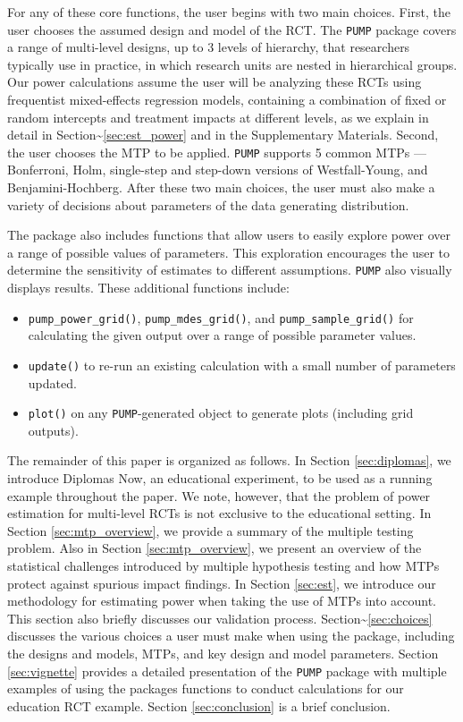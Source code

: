 \documentclass[
]{article}
\providecommand{\tightlist}{%
  \setlength{\itemsep}{0pt}\setlength{\parskip}{0pt}}
\begin{document}
For any of these core functions, the user begins with two main choices.
First, the user chooses the assumed design and model of the RCT. The
\texttt{PUMP} package covers a range of multi-level designs, up to 3
levels of hierarchy, that researchers typically use in practice, in
which research units are nested in hierarchical groups. Our power
calculations assume the user will be analyzing these RCTs using
frequentist mixed-effects regression models, containing a combination of
fixed or random intercepts and treatment impacts at different levels, as
we explain in detail in Section\textasciitilde{}\ref{sec:est_power} and
in the Supplementary Materials. Second, the user chooses the MTP to be
applied. \texttt{PUMP} supports 5 common MTPs --- Bonferroni, Holm,
single-step and step-down versions of Westfall-Young, and
Benjamini-Hochberg. After these two main choices, the user must also
make a variety of decisions about parameters of the data generating
distribution.

The package also includes functions that allow users to easily explore
power over a range of possible values of parameters. This exploration
encourages the user to determine the sensitivity of estimates to
different assumptions. \texttt{PUMP} also visually displays results.
These additional functions include:

\begin{itemize}
\tightlist
\item
  \texttt{pump\_power\_grid()}, \texttt{pump\_mdes\_grid()}, and
  \texttt{pump\_sample\_grid()} for calculating the given output over a
  range of possible parameter values.
\item
  \texttt{update()} to re-run an existing calculation with a small
  number of parameters updated.
\item
  \texttt{plot()} on any \texttt{PUMP}-generated object to generate
  plots (including grid outputs).
\end{itemize}

The remainder of this paper is organized as follows. In Section
\ref{sec:diplomas}, we introduce Diplomas Now, an educational
experiment, to be used as a running example throughout the paper. We
note, however, that the problem of power estimation for multi-level RCTs
is not exclusive to the educational setting. In Section
\ref{sec:mtp_overview}, we provide a summary of the multiple testing
problem. Also in Section \ref{sec:mtp_overview}, we present an overview
of the statistical challenges introduced by multiple hypothesis testing
and how MTPs protect against spurious impact findings. In Section
\ref{sec:est}, we introduce our methodology for estimating power when
taking the use of MTPs into account. This section also briefly discusses
our validation process. Section\textasciitilde{}\ref{sec:choices}
discusses the various choices a user must make when using the package,
including the designs and models, MTPs, and key design and model
parameters. Section \ref{sec:vignette} provides a detailed presentation
of the \texttt{PUMP} package with multiple examples of using the
packages functions to conduct calculations for our education RCT
example. Section \ref{sec:conclusion} is a brief conclusion.
\end{document}
